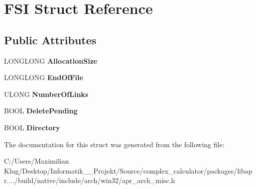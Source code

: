 \hypertarget{struct_f_s_i}{}\section{F\+SI Struct Reference}
\label{struct_f_s_i}
\subsection*{Public Attributes}
\begin{DoxyCompactItemize}
\item 
\mbox{\label{struct_f_s_i_ad4c33115c6f5c1077bcdc8cb1fb6d599}} 
L\+O\+N\+G\+L\+O\+NG {\bfseries Allocation\+Size}
\item 
\mbox{\label{struct_f_s_i_a09bc17bd09b207aac72e050b25823649}} 
L\+O\+N\+G\+L\+O\+NG {\bfseries End\+Of\+File}
\item 
\mbox{\label{struct_f_s_i_a421a503e1ec3e89b0ad3e267157b3d2a}} 
U\+L\+O\+NG {\bfseries Number\+Of\+Links}
\item 
\mbox{\label{struct_f_s_i_a7a518162b2055fc67146af410926f619}} 
B\+O\+OL {\bfseries Delete\+Pending}
\item 
\mbox{\label{struct_f_s_i_a0eff3a234660d8b546ace06282e9bdda}} 
B\+O\+OL {\bfseries Directory}
\end{DoxyCompactItemize}


The documentation for this struct was generated from the following file\+:\begin{DoxyCompactItemize}
\item 
C\+:/\+Users/\+Maximilian Klug/\+Desktop/\+Informatik\+\_\+\_\+\+Projekt/\+Source/complex\+\_\+calculator/packages/libapr..../build/native/include/arch/win32/apr\+\_\+arch\+\_\+misc.\+h\end{DoxyCompactItemize}
